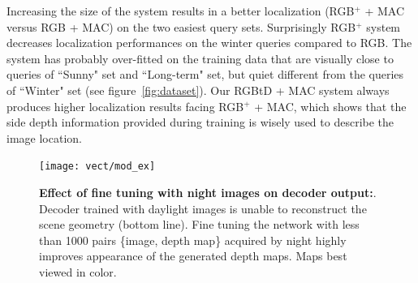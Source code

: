 

Increasing the size of the system results in a better localization (RGB$^{+}$ + MAC versus RGB + MAC) on the two easiest query sets. Surprisingly RGB$^{+}$ system decreases localization performances on the winter queries compared to RGB. The system has probably over-fitted on the training data that are visually close to queries of ``Sunny" set and ``Long-term" set, but quiet different from the queries of ``Winter" set (see figure~\ref{fig:dataset}). Our RGBtD + MAC system always produces higher localization results facing RGB$^{+}$ + MAC, which shows that the side depth information provided during training is wisely used to describe the image location. 

\begin{figure}
	\center
	\texttt{[image: vect/mod\_ex]}	
	\caption{\label{fig:mod_ex} \textbf{Effect of fine tuning with night images on decoder output:}. Decoder trained with daylight images is unable to reconstruct the scene geometry (bottom line). Fine tuning the network with less than 1000 pairs \{image, depth map\} acquired by night highly improves appearance of the generated depth maps. Maps best viewed in color.}
\end{figure}

